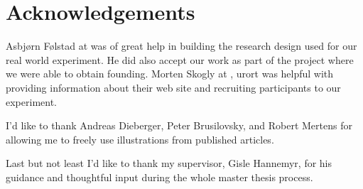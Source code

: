 \chapter{Acknowledgements}

Asbj\o{}rn F\o{}lstad at  was of great help in building the
research design used for our real world experiment.
He did also accept our work as part of the  project where we
were able to obtain founding.
Morten Skogly at ,
urort{} was helpful with providing information about their web site and
recruiting participants to our experiment.

I'd like to thank
Andreas Dieberger,
Peter Brusilovsky, and
Robert Mer\-t\-ens
for allowing me to freely use illustrations from
published articles.

Last but not least I'd like to thank my supervisor, Gisle Hannemyr, for
his guidance and thoughtful input during the whole master thesis process.
